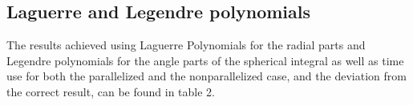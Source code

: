 \documentclass[10pt,a4paper]{article}
\begin{document}
\subsection{Laguerre and Legendre polynomials}

The results achieved using Laguerre Polynomials for the radial parts and Legendre polynomials for the angle parts of the spherical integral as well as time use for both the parallelized and the nonparallelized case, and the deviation from the correct result, can be found in table 2.

\begin{comment}

\begin{table}[H]
\caption[Spherical Quadrature using Laguerre polynomials]{Achieved results, relative error, time-usage in seconds (averaged over 5 simulations, but for n=55 and n=65)for both the nonparallel and the parallel program (without optimization flags) as well as standard error for integration using Laguerre polynomials (for the radial parts).}
\begin{tabular}{|l|l|l|l|l|}
\hline
N         & Result   & Relative Error & \pbox{10cm}{time {[}s{]}\\ parallelized}  &  \pbox{10cm}{time {[}s{]}\\ nonparallelized} \\ \hline
10 & 0.177081 & 0.0813679      & 0.05331922                              & 0.1115982 \\ \hline
15 & 0.193285 & 0.00269565     & 0.3914072                               & 1.200048  \\ \hline
20 & 0.194786 & 0.0104784      & 2.044996                                & 7.023426  \\ \hline
25 & 0.194804 & 0.0105751      & 8.18345                                 & -       \\ \hline
30 & 0.194779 & 0.010443       & 25.8677                                 & 81.0227   \\ \hline
40 & 0.194669 & 0.009873       & 142.9906                                & -       \\ \hline
45 & 0.194594 & 0.00948246     & 269.7448                                & -       \\ \hline
55 & 0.194439 & 0.00868232     & 884.532                                 & -       \\ \hline
65 & 0.194298 & 0.00794811     & 2429.59                                 & -       \\ \hline
\end{tabular}
\end{table}

\end{comment}
\end{document}
